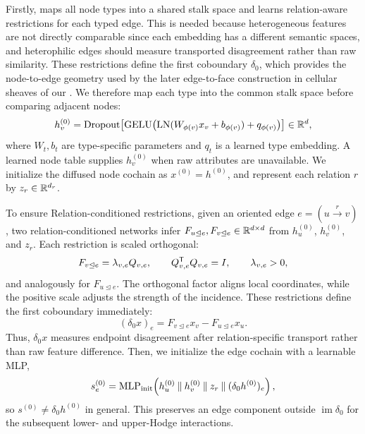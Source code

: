 Firstly, \method{} maps all node types into a shared stalk space and learns relation-aware restrictions
for each typed edge. This is needed because heterogeneous features are not directly comparable since each embedding has a different semantic spaces, and heterophilic edges should measure transported disagreement rather than raw similarity. These
restrictions define the first coboundary \(\delta_0\), which provides the node-to-edge geometry used
by the later edge-to-face construction in cellular sheaves of our \method{}. We therefore map
each type into the common stalk space before comparing adjacent nodes:
\begin{equation}
  h_v^{(0)}
  =\operatorname{Dropout}\!\left[
    \operatorname{GELU}\!\left(
      \operatorname{LN}(W_{\phi(v)}x_v+b_{\phi(v)})+q_{\phi(v)}
    \right)
  \right]\in\mathbb{R}^d ,
  \label{eq:node-encoder}
\end{equation}
where \(W_t,b_t\) are type-specific parameters and \(q_t\) is a learned type embedding.  A learned
node table supplies \(h_v^{(0)}\) when raw attributes are unavailable.  We initialize the diffused
node cochain as \(x^{(0)}=h^{(0)}\), and represent each relation \(r\) by
\(z_r\in\mathbb{R}^{d_r}\).

To ensure Relation-conditioned restrictions, given an oriented edge \(e=(u\xrightarrow{r}v)\), two relation-conditioned networks infer
\(F_{u\unlhd e},F_{v\unlhd e}\in\mathbb{R}^{d\times d}\) from
\(h_u^{(0)}\), \(h_v^{(0)}\), and \(z_r\).  Each restriction is scaled orthogonal:
\begin{equation}
  F_{v\unlhd e}=\lambda_{v,e}Q_{v,e},
  \qquad Q_{v,e}^{\mathsf{T}}Q_{v,e}=I,
  \qquad \lambda_{v,e}>0 ,
  \label{eq:conformal-map}
\end{equation}
and analogously for \(F_{u\unlhd e}\).  The orthogonal factor aligns local coordinates, while the
positive scale adjusts the strength of the incidence.  These restrictions define the first
coboundary immediately:
\begin{equation}
  (\delta_0x)_e
  =F_{v\unlhd e}x_v-F_{u\unlhd e}x_u .
  \label{eq:delta0}
\end{equation}
Thus, \(\delta_0x\) measures endpoint disagreement after relation-specific transport rather than
raw feature difference. Then, we initialize the edge cochain with a learnable MLP,
\begin{equation}
  s_e^{(0)}
  =\operatorname{MLP}_{\mathrm{init}}\!\left(
    h_u^{(0)}\mathbin\Vert h_v^{(0)}\mathbin\Vert z_r
    \mathbin\Vert(\delta_0h^{(0)})_e
  \right),
  \label{eq:edge-init}
\end{equation}
so \(s^{(0)}\neq\delta_0h^{(0)}\) in general.  This preserves an edge component outside
\(\operatorname{im}\delta_0\) for the subsequent lower- and upper-Hodge interactions.

